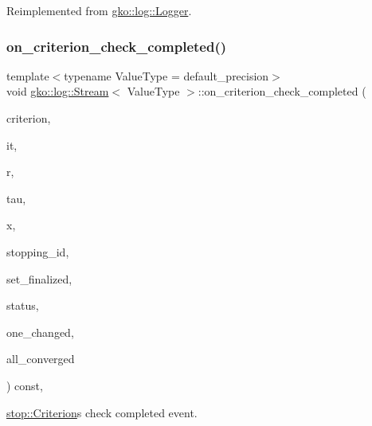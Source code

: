 Reimplemented from \hyperlink{classgko_1_1log_1_1Logger}{gko\+::log\+::\+Logger}.

\mbox{\label{classgko_1_1log_1_1Stream_a9e13f363f4318fcc1269eb9b05dd3597}} 
\subsubsection{\texorpdfstring{on\+\_\+criterion\+\_\+check\+\_\+completed()}{on\_criterion\_check\_completed()}}
{\footnotesize\ttfamily template$<$typename Value\+Type  = default\+\_\+precision$>$ \\
void \hyperlink{classgko_1_1log_1_1Stream}{gko\+::log\+::\+Stream}$<$ Value\+Type $>$\+::on\+\_\+criterion\+\_\+check\+\_\+completed (\begin{DoxyParamCaption}\item[{const \hyperlink{classgko_1_1stop_1_1Criterion}{stop\+::\+Criterion} $\ast$}]{criterion,  }\item[{const \hyperlink{namespacegko_a6e5c95df0ae4e47aab2f604a22d98ee7}{size\+\_\+type} \&}]{it,  }\item[{const \hyperlink{classgko_1_1LinOp}{Lin\+Op} $\ast$}]{r,  }\item[{const \hyperlink{classgko_1_1LinOp}{Lin\+Op} $\ast$}]{tau,  }\item[{const \hyperlink{classgko_1_1LinOp}{Lin\+Op} $\ast$}]{x,  }\item[{const \hyperlink{namespacegko_a3950fc3732811a8563484e5098c31531}{uint8} \&}]{stopping\+\_\+id,  }\item[{const bool \&}]{set\+\_\+finalized,  }\item[{const \hyperlink{classgko_1_1Array}{Array}$<$ \hyperlink{classgko_1_1stopping__status}{stopping\+\_\+status} $>$ $\ast$}]{status,  }\item[{const bool \&}]{one\+\_\+changed,  }\item[{const bool \&}]{all\+\_\+converged }\end{DoxyParamCaption}) const\hspace{0.3cm}{\ttfamily [override]}, {\ttfamily [virtual]}}



\hyperlink{classgko_1_1stop_1_1Criterion}{stop\+::\+Criterion}\textquotesingle{}s check completed event. 

